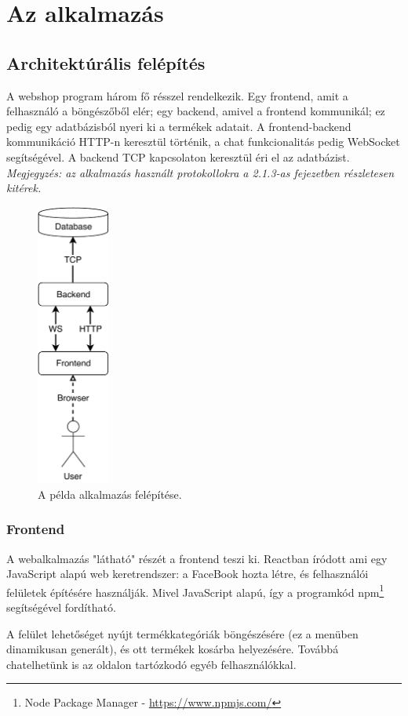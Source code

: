 \chapter{Az alkalmazás}
\section{Architektúrális felépítés}
A webshop program három fő résszel rendelkezik. Egy frontend, amit a felhasználó a böngészőből elér; egy backend, amivel a frontend kommunikál; ez pedig egy adatbázisból nyeri ki a termékek adatait. A frontend-backend kommunikáció HTTP-n keresztül történik, a chat funkcionalitás pedig WebSocket segítségével. A backend TCP kapcsolaton keresztül éri el az adatbázist.
\vskip 0.1in
\textit{Megjegyzés: az alkalmazás használt protokollokra a 2.1.3-as fejezetben részletesen kitérek.}
\begin{figure}[ht]
\centering
\includegraphics[width=24mm, keepaspectratio]{img/app_architecture.pdf}
\caption{A példa alkalmazás felépítése.}
\end{figure}
\vskip 0.1in
\newpage
\subsection{Frontend}
A webalkalmazás "látható" részét a frontend teszi ki. Reactban íródott ami egy JavaScript alapú web keretrendszer: a FaceBook hozta létre, és felhasználói felületek építésére használják.\cite{Node_W3} Mivel JavaScript alapú, így a programkód npm\footnote{Node Package Manager - \url{https://www.npmjs.com/}} segítségével fordítható.

A felület lehetőséget nyújt termékkategóriák böngészésére (ez a menüben dinamikusan generált), és ott termékek kosárba helyezésére. Továbbá chatelhetünk is az oldalon tartózkodó egyéb felhasználókkal.


